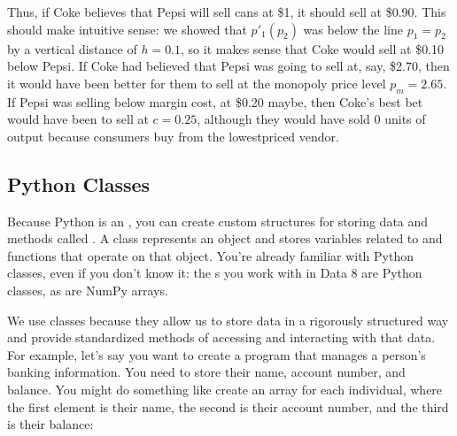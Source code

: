 \documentclass[letterpaper,10pt,english]{jupyterBook}
\begin{document}
\sphinxAtStartPar
Thus, if Coke believes that Pepsi will sell cans at \$1, it should sell at \$0.90. This should make intuitive sense: we showed that \(p'_1(p_2)\) was below the line \(p_1=p_2\) by a vertical distance of \(h=0.1\), so it makes sense that Coke would sell at \$0.10 below Pepsi. If Coke had believed that Pepsi was going to sell at, say, \$2.70, then it would have been better for them to sell at the monopoly price level \(p_m = 2.65\). If Pepsi was selling below margin cost, at \$0.20 maybe, then Coke’s best bet would have been to sell at \(c = 0.25\), although they would have sold 0 units of output because consumers buy from the lowest\sphinxhyphen{}priced vendor.


\subsection{Python Classes}
\label{\detokenize{content/07-game-theory/python-classes:python-classes}}\label{\detokenize{content/07-game-theory/python-classes::doc}}
\sphinxAtStartPar
Because Python is an , you can create custom structures for storing data and methods called . A class represents an object and stores variables related to and functions that operate on that object. You’re already familiar with Python classes, even if you don’t know it: the s you work with in Data 8 are Python classes, as are NumPy arrays.

\sphinxAtStartPar
We use classes because they allow us to store data in a rigorously structured way and provide standardized methods of accessing and interacting with that data. For example, let’s say you want to create a program that manages a person’s banking information. You need to store their name, account number, and balance. You might do something like create an array for each individual, where the first element is their name, the second is their account number, and the third is their balance:

\begin{sphinxVerbatim}[commandchars=\\\{\}]
    
    
\end{sphinxVerbatim}
\end{document}
